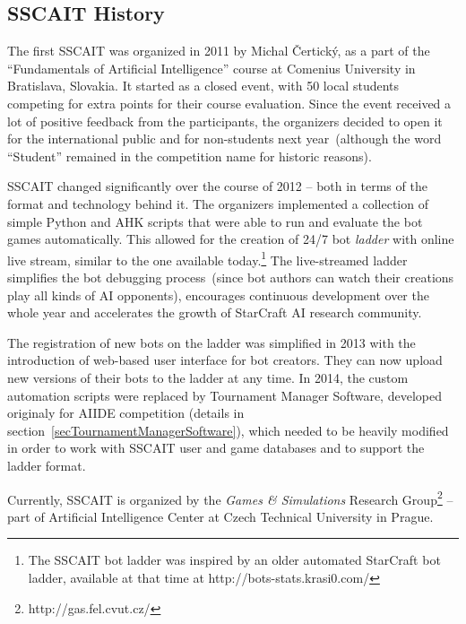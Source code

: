 \subsection{SSCAIT History}

The first SSCAIT was organized in 2011 by Michal \v{C}ertick\'{y}, as a part of the ``Fundamentals of Artificial Intelligence'' course at Comenius University in Bratislava, Slovakia. It started as a closed event, with 50 local students competing for extra points for their course evaluation. Since the event received a lot of positive feedback from the participants, the organizers decided to open it for the international public and for non-students next year~(although the word ``Student'' remained in the competition name for historic reasons). 

SSCAIT changed significantly over the course of 2012 -- both in terms of the format and technology behind it. The organizers implemented a collection of simple Python and AHK scripts that were able to run and evaluate the bot games automatically. This allowed for the creation of 24/7 bot {\em ladder} with online live stream, similar to the one available today.\footnote{The SSCAIT bot ladder was inspired by an older automated StarCraft bot ladder, available at that time at http://bots-stats.krasi0.com/} The live-streamed ladder simplifies the bot debugging process~(since bot authors can watch their creations play all kinds of AI opponents), encourages continuous development over the whole year and accelerates the growth of StarCraft AI research community. 

The registration of new bots on the ladder was simplified in 2013 with the introduction of web-based user interface for bot creators. They can now upload new versions of their bots to the ladder at any time. In 2014, the custom automation scripts were replaced by Tournament Manager Software, developed originaly for AIIDE competition (details in section~\ref{secTournamentManagerSoftware}), which needed to be heavily modified in order to work with SSCAIT user and game databases and to support the ladder format. 



Currently, SSCAIT is organized by the {\em Games \& Simulations} Research Group\footnote{http://gas.fel.cvut.cz/} -- part of Artificial Intelligence Center at Czech Technical University in Prague.

